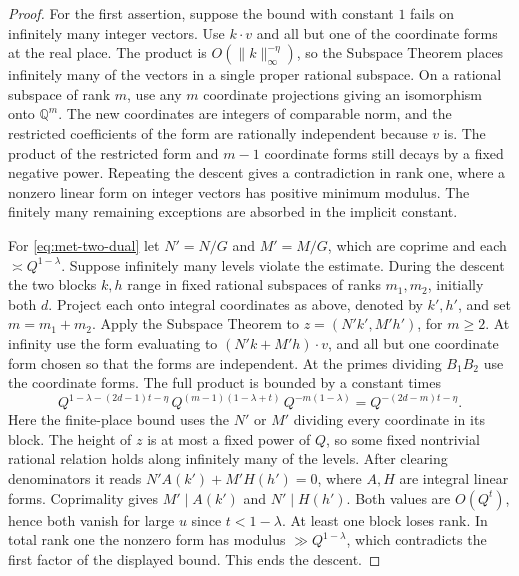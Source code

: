 \documentclass[11pt,reqno,a4paper]{amsart}
\theoremstyle{remark}
\begin{document}
\begin{proof}
For the first assertion, suppose the bound with constant \(1\) fails
on infinitely many integer vectors. Use \(k\cdot v\) and all but one of
the coordinate forms at the real place. The product is
\(O(\|k\|_\infty^{-\eta})\), so the Subspace Theorem places infinitely
many of the vectors in a single proper rational subspace. On a
rational subspace of rank \(m\), use any \(m\) coordinate projections
giving an isomorphism onto \(\mathbb Q^m\). The new coordinates are
integers of comparable norm, and the restricted coefficients of the
form are rationally independent because \(v\) is. The product of the
restricted form and \(m-1\) coordinate forms still decays by a fixed
negative power. Repeating the descent gives a contradiction in rank
one, where a nonzero linear form on integer vectors has positive
minimum modulus. The finitely many remaining exceptions are absorbed
in the implicit constant.

For \eqref{eq:met-two-dual} let \(N'=N/G\) and \(M'=M/G\), which are
coprime and each \(\asymp Q^{1-\lambda}\). Suppose infinitely many
levels violate the estimate. During the descent the two blocks \(k,h\)
range in fixed rational subspaces of ranks \(m_1,m_2\), initially
both \(d\). Project each onto integral coordinates as above, denoted
by \(k',h'\), and set \(m=m_1+m_2\). Apply the Subspace Theorem to
\(z=(N'k',M'h')\), for \(m\geq2\). At infinity use the form evaluating
to \((N'k+M'h)\cdot v\), and all but one coordinate form chosen so
that the forms are independent. At the primes dividing \(B_1B_2\)
use the coordinate forms. The full product is bounded by a constant
times
\[
 Q^{1-\lambda-(2d-1)t-\eta}\,
 Q^{(m-1)(1-\lambda+t)}\,
 Q^{-m(1-\lambda)}
 = Q^{-(2d-m)t-\eta}.
\]
Here the finite-place bound uses the \(N'\) or \(M'\) dividing every
coordinate in its block. The height of \(z\) is at most a fixed power
of \(Q\), so some fixed nontrivial rational relation holds along
infinitely many of the levels. After clearing denominators it reads
\(N'A(k')+M'H(h')=0\), where \(A,H\) are integral linear forms.
Coprimality gives \(M'\mid A(k')\) and \(N'\mid H(h')\). Both values
are \(O(Q^t)\), hence both vanish for large \(u\) since \(t<1-\lambda\).
At least one block loses rank. In total rank one the nonzero form has
modulus \(\gg Q^{1-\lambda}\), which contradicts the first factor of
the displayed bound. This ends the descent.
\end{proof}
\end{document}
